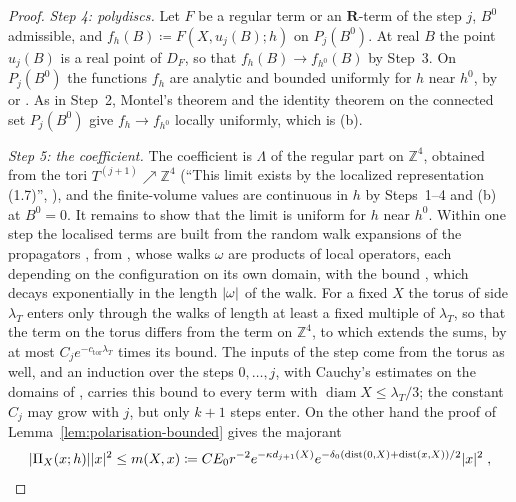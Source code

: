 \documentclass[11pt]{preprint}
\newcommand{\diam}{\operatorname{diam}}
\newcommand{\dist}{\operatorname{dist}}
\DeclarePairedDelimiter{\abs}{\lvert}{\rvert}
\numberwithin{equation}{section}
\theoremstyle{definition}
\theoremstyle{remark}
\theoremstyle{plain}
\begin{document}
\begin{proof}
\emph{Step 4: polydiscs.} Let $F$ be a regular term or an $\mathbf R$-term of the step $j$, $B^0$ admissible, and $f_h(B) \coloneqq F(X, u_j(B); h)$ on $P_j(B^0)$. At real $B$ the point $u_j(B)$ is a real point of $D_F$, so that $f_h(B) \to f_{h^0}(B)$ by Step~3. On $P_j(B^0)$ the functions $f_h$ are analytic and bounded uniformly for $h$ near $h^0$, by \cite[(1.18), p.~263]{BalabanRG1} or \cite[(2.31), p.~260]{BalabanCRE}. As in Step~2, Montel's theorem and the identity theorem on the connected set $P_j(B^0)$ give $f_h \to f_{h^0}$ locally uniformly, which is (b).

\emph{Step 5: the coefficient.} The coefficient is $\Lambda$ of the regular part on $\mathbb Z^4$, obtained from the tori $T^{(j+1)} \nearrow \mathbb Z^4$ (``This limit exists by the localized representation (1.7)'', \cite[p.~264, after (1.21)]{BalabanRG1}), and the finite-volume values are continuous in $h$ by Steps~1--4 and (b) at $B^0 = 0$. It remains to show that the limit is uniform for $h$ near $h^0$. Within one step the localised terms are built from the random walk expansions of the propagators \cite[(1.6)--(1.7), p.~3]{BalabanRG2}, from \cite[(3.105)--(3.108), pp.~414--416]{BalabanPBG}, whose walks $\omega$ are products of local operators, each depending on the configuration on its own domain, with the bound \cite[(1.7), p.~3]{BalabanRG2}, which decays exponentially in the length $\abs{\omega}$ of the walk. For a fixed $X$ the torus of side $\lambda_T$ enters only through the walks of length at least a fixed multiple of $\lambda_T$, so that the term on the torus differs from the term on $\mathbb Z^4$, to which \cite[p.~281]{BalabanCRE} extends the sums, by at most $C_je^{-c_{\mathrm{tor}}\lambda_T}$ times its bound. The inputs of the step come from the torus as well, and an induction over the steps $0, \dots, j$, with Cauchy's estimates on the domains of \cite[p.~259]{BalabanCRE}, carries this bound to every term with $\diam X \leq \lambda_T/3$; the constant $C_j$ may grow with $j$, but only $k + 1$ steps enter. On the other hand the proof of Lemma~\ref{lem:polarisation-bounded} gives the majorant
\begin{equation}\label{eq:polarisation-majorant}
    \abs{\Pi_X(x; h)}\abs{x}^2 \leq m(X, x) \coloneqq CE_0r^{-2}e^{-\kappa d_{j+1}(X)}e^{-\delta_0(\dist(0, X) + \dist(x, X))/2}\abs{x}^2\;,
\end{equation}

\end{proof}
\end{document}

